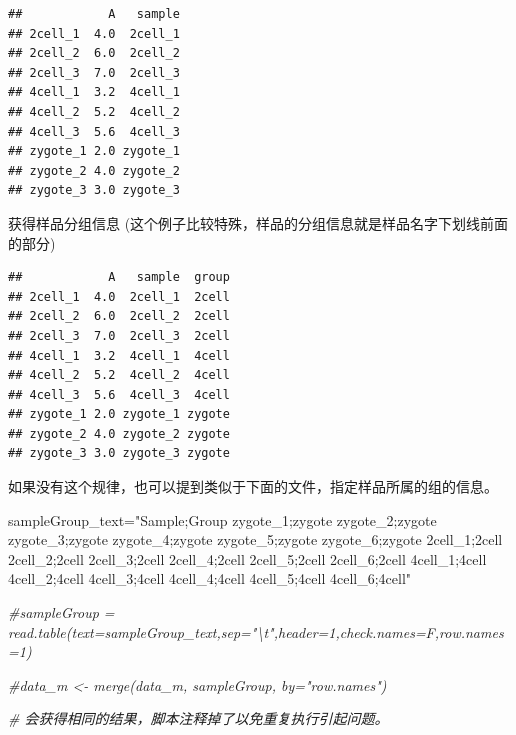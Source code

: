 \documentclass[]{article}
\newenvironment{Shaded}{\begin{snugshade}}{\end{snugshade}}
\newcommand{\KeywordTok}[1]{\textcolor[rgb]{0.13,0.29,0.53}{\textbf{{#1}}}}
\newcommand{\DecValTok}[1]{\textcolor[rgb]{0.00,0.00,0.81}{{#1}}}
\newcommand{\StringTok}[1]{\textcolor[rgb]{0.31,0.60,0.02}{{#1}}}
\newcommand{\CommentTok}[1]{\textcolor[rgb]{0.56,0.35,0.01}{\textit{{#1}}}}
\newcommand{\NormalTok}[1]{{#1}}
\numberwithin{figure}{section}
\numberwithin{table}{section}
\theoremstyle{definition}
\theoremstyle{definition}
\theoremstyle{definition}
\theoremstyle{remark}
\begin{document}
\begin{verbatim}
##            A   sample
## 2cell_1  4.0  2cell_1
## 2cell_2  6.0  2cell_2
## 2cell_3  7.0  2cell_3
## 4cell_1  3.2  4cell_1
## 4cell_2  5.2  4cell_2
## 4cell_3  5.6  4cell_3
## zygote_1 2.0 zygote_1
## zygote_2 4.0 zygote_2
## zygote_3 3.0 zygote_3
\end{verbatim}

获得样品分组信息
(这个例子比较特殊，样品的分组信息就是样品名字下划线前面的部分)

\begin{Shaded}
\end{Shaded}

\begin{verbatim}
##            A   sample  group
## 2cell_1  4.0  2cell_1  2cell
## 2cell_2  6.0  2cell_2  2cell
## 2cell_3  7.0  2cell_3  2cell
## 4cell_1  3.2  4cell_1  4cell
## 4cell_2  5.2  4cell_2  4cell
## 4cell_3  5.6  4cell_3  4cell
## zygote_1 2.0 zygote_1 zygote
## zygote_2 4.0 zygote_2 zygote
## zygote_3 3.0 zygote_3 zygote
\end{verbatim}

如果没有这个规律，也可以提到类似于下面的文件，指定样品所属的组的信息。

\begin{Shaded}
\begin{Highlighting}[]
\NormalTok{sampleGroup_text=}\StringTok{"Sample;Group}
\StringTok{zygote_1;zygote}
\StringTok{zygote_2;zygote}
\StringTok{zygote_3;zygote}
\StringTok{zygote_4;zygote}
\StringTok{zygote_5;zygote}
\StringTok{zygote_6;zygote}
\StringTok{2cell_1;2cell}
\StringTok{2cell_2;2cell}
\StringTok{2cell_3;2cell}
\StringTok{2cell_4;2cell}
\StringTok{2cell_5;2cell}
\StringTok{2cell_6;2cell}
\StringTok{4cell_1;4cell}
\StringTok{4cell_2;4cell}
\StringTok{4cell_3;4cell}
\StringTok{4cell_4;4cell}
\StringTok{4cell_5;4cell}
\StringTok{4cell_6;4cell"}

\CommentTok{#sampleGroup = read.table(text=sampleGroup_text,sep="\textbackslash{}t",header=1,check.names=F,row.names=1)}

\CommentTok{#data_m <- merge(data_m, sampleGroup, by="row.names")}

\CommentTok{# 会获得相同的结果，脚本注释掉了以免重复执行引起问题。}
\end{Highlighting}
\end{Shaded}
\end{document}
